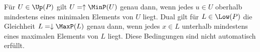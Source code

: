 \begin{theorem}
\label{b12guide:thm:minimal-generation}
Für $U\in\Up(P)$ gilt $U=\uparrow\MinP(U)$ genau dann,
wenn jedes $u\in U$ oberhalb mindestens eines minimalen Elements
von $U$ liegt. Dual gilt für $L\in\Low(P)$ die Gleichheit
$L=\downarrow\MaxP(L)$ genau dann, wenn jedes $x\in L$
unterhalb mindestens eines maximalen Elements von $L$ liegt.
Diese Bedingungen sind nicht automatisch erfüllt.
\end{theorem}
